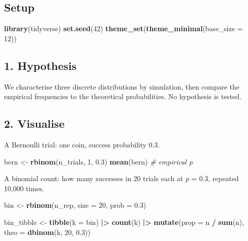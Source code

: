 \documentclass[
]{article}
\newenvironment{Shaded}{\begin{snugshade}}{\end{snugshade}}
\newcommand{\AttributeTok}[1]{\textcolor[rgb]{0.13,0.29,0.53}{#1}}
\newcommand{\CommentTok}[1]{\textcolor[rgb]{0.56,0.35,0.01}{\textit{#1}}}
\newcommand{\DecValTok}[1]{\textcolor[rgb]{0.00,0.00,0.81}{#1}}
\newcommand{\FloatTok}[1]{\textcolor[rgb]{0.00,0.00,0.81}{#1}}
\newcommand{\FunctionTok}[1]{\textcolor[rgb]{0.13,0.29,0.53}{\textbf{#1}}}
\newcommand{\NormalTok}[1]{#1}
\newcommand{\OtherTok}[1]{\textcolor[rgb]{0.56,0.35,0.01}{#1}}
\newcommand{\SpecialCharTok}[1]{\textcolor[rgb]{0.81,0.36,0.00}{\textbf{#1}}}
\begin{document}
\subsection{Setup}\label{setup}

\begin{Shaded}
\begin{Highlighting}[]
\FunctionTok{library}\NormalTok{(tidyverse)}
\FunctionTok{set.seed}\NormalTok{(}\DecValTok{42}\NormalTok{)}
\FunctionTok{theme\_set}\NormalTok{(}\FunctionTok{theme\_minimal}\NormalTok{(}\AttributeTok{base\_size =} \DecValTok{12}\NormalTok{))}
\end{Highlighting}
\end{Shaded}

\subsection{1. Hypothesis}\label{hypothesis}

We characterise three discrete distributions by simulation, then compare
the empirical frequencies to the theoretical probabilities. No
hypothesis is tested.

\subsection{2. Visualise}\label{visualise}

A Bernoulli trial: one coin, success probability 0.3.

\begin{Shaded}
\begin{Highlighting}[]
\NormalTok{bern }\OtherTok{\textless{}{-}} \FunctionTok{rbinom}\NormalTok{(n\_trials, }\DecValTok{1}\NormalTok{, }\FloatTok{0.3}\NormalTok{)}
\FunctionTok{mean}\NormalTok{(bern)   }\CommentTok{\# empirical p}
\end{Highlighting}
\end{Shaded}

A binomial count: how many successes in 20 trials each at \emph{p} =
0.3, repeated 10,000 times.

\begin{Shaded}
\begin{Highlighting}[]
\NormalTok{bin  }\OtherTok{\textless{}{-}} \FunctionTok{rbinom}\NormalTok{(n\_rep, }\AttributeTok{size =} \DecValTok{20}\NormalTok{, }\AttributeTok{prob =} \FloatTok{0.3}\NormalTok{)}

\NormalTok{bin\_tibble }\OtherTok{\textless{}{-}} \FunctionTok{tibble}\NormalTok{(}\AttributeTok{k =}\NormalTok{ bin) }\SpecialCharTok{|\textgreater{}}
  \FunctionTok{count}\NormalTok{(k) }\SpecialCharTok{|\textgreater{}}
  \FunctionTok{mutate}\NormalTok{(}\AttributeTok{prop =}\NormalTok{ n }\SpecialCharTok{/} \FunctionTok{sum}\NormalTok{(n),}
         \AttributeTok{theo =} \FunctionTok{dbinom}\NormalTok{(k, }\DecValTok{20}\NormalTok{, }\FloatTok{0.3}\NormalTok{))}
\end{Highlighting}
\end{Shaded}
\end{document}
